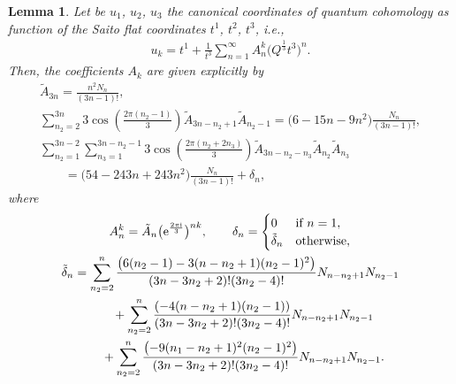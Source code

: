 \documentclass[11pt]{article}
\numberwithin{equation}{section}
\numberwithin{equation}{section}
\newtheorem{Lemma}[Theorem]{Lemma}
\begin{document}
\begin{Lemma}
Let be $u_1$, $u_2$, $u_3$ the canonical coordinates of quantum cohomology as function of the Saito flat coordinates $t^1$, $t^2$, $t^3$, i.e.,
\begin{gather}\label{canonical coordinates lemma appendix}
u_k=t^1+\frac{1}{t^3}\sum_{n=1}^{\infty} A_n^k \bigl( Q^{\frac{1}{3}}t^3 \bigr)^n.
\end{gather}
Then, the coefficients $A_{k}$ are given explicitly by
\begin{gather*}
\tilde A_{3n}=\frac{n^2N_n}{(3n-1)! },\\
\sum_{n_2=2}^{3n}3\cos\left( \frac{2\pi (n_2-1)}{3}\right) \tilde A_{3n-n_2+1} \tilde A_{n_2-1}=\bigl(6-15n-9n^2 \bigr)\frac{N_n}{(3n-1)!},\\
\sum_{n_2=1}^{3n-2}\sum_{n_3=1}^{3n-n_2-1}3\cos\left( \frac{2\pi (n_2+2n_3 )}{3} \right) \tilde A_{3n-n_2-n_3} \tilde A_{n_2} \tilde A_{n_3}\\
\qquad=\bigl(54-243n +243n^2\bigr)\frac{N_n}{(3n-1)!}+\delta_{n} ,
\end{gather*}
where
\begin{gather*}
A_n^k=\tilde A_n \bigl( {\rm e}^{\frac{2\pi {\rm i}}{3}}\bigr)^{nk},
\qquad
\delta_n=
\begin{cases}
0& \text{if } n=1,\\
 \tilde\delta_n & \text{otherwise},
\end{cases}
\\
\tilde\delta_n=\sum_{n_2=2}^{n}\frac{\bigl(6(n_2-1)-3(n-n_2+1)(n_2-1)^2 \bigr)}{(3n-3n_2+2)!(3n_2-4)!} N_{n-n_2+1}N_{n_2-1}\\
\phantom{\tilde\delta_n=}{}+\sum_{n_2=2}^{n}\frac{(-4(n-n_2+1)(n_2-1) )}{(3n-3n_2+2)!(3n_2-4)!} N_{n-n_2+1}N_{n_2-1}\\
\phantom{\tilde\delta_n=}{}+\sum_{n_2=2}^{n}\frac{\bigl(-9(n_1-n_2+1)^2(n_2-1)^2 \bigr)}{(3n-3n_2+2)!(3n_2-4)!} N_{n-n_2+1}N_{n_2-1}.
\end{gather*}
\end{Lemma}
\end{document}
